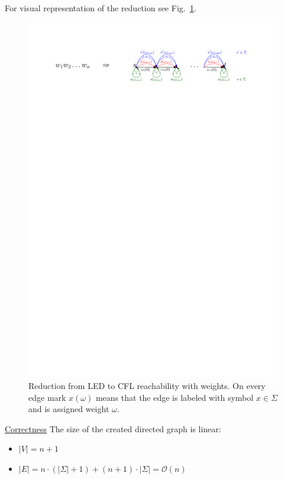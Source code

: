 \documentclass[12pt]{article}
\begin{document}
For visual representation of the reduction see Fig.~\ref{fig:led}.

\begin{figure}[!htp]
		
	\begin{center}  
		\includegraphics[scale=1]{pictures/led_to_cflr.pdf}
	\end{center}
	
	\caption{Reduction from LED to CFL reachability with weights. On every edge mark $x(\omega)$ means that the edge is labeled with symbol $x \in \Sigma$ and is assigned weight $\omega$.}
	\label{fig:led}
	
\end{figure}

\underline{Correctness} The size of the created directed graph is linear:

\begin{itemize}
    \item $|V| = n + 1$
    \item $|E| = n \cdot (|\Sigma| + 1) + (n + 1) \cdot |\Sigma| = \mathcal{O}(n)$
\end{itemize}
\end{document}
